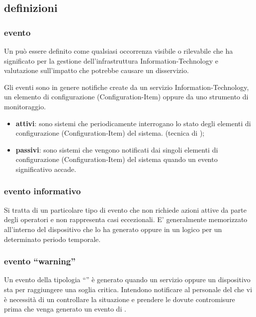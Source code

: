 \subsection[Definizioni]{definizioni}
\label{em-introduction-definitions}

\subsubsection{evento}
Un  può essere definito come qualsiasi occorrenza visibile o rilevabile che ha significato per la gestione dell'infrastruttura \acs{Information-Technology} e valutazione sull'impatto che potrebbe causare un disservizio.

Gli eventi sono in genere notifiche create da un servizio \acs{Information-Technology}, un elemento di configurazione (\acs{Configuration-Item}) oppure da uno strumento di monitoraggio.

\begin{itemize}
\item{\textbf{attivi}: sono sistemi che periodicamente interrogano lo stato degli elementi di configurazione (\ac{Configuration-Item}) del sistema. (tecnica di );}
\item{\textbf{passivi}: sono sistemi che vengono notificati dai singoli elementi di configurazione (\ac{Configuration-Item}) del sistema quando un evento significativo accade.}
\end{itemize}

\subsubsection{evento informativo}
Si tratta di un particolare tipo di evento che non richiede azioni attive da parte degli operatori e non rappresenta casi eccezionali. E' generalmente memorizzato all'interno del dispositivo che lo ha generato oppure in un  logico per un determinato periodo temporale.

\subsubsection{evento ``warning''}
Un evento della tipologia ``'' è generato quando un servizio oppure un dispositivo sta per raggiungere una soglia critica. Intendono notificare al personale del  che vi è necessità di un controllare la situazione e prendere le dovute contromisure prima che venga generato un evento di .

